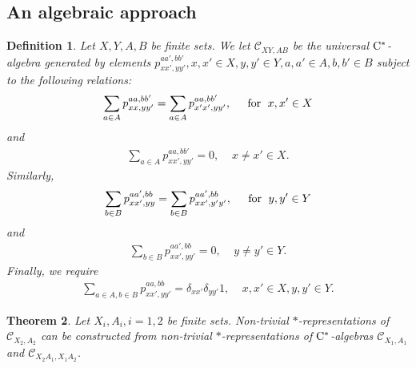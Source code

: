 \documentclass[11pt]{amsart}
\newtheorem{theorem}{Theorem}[section]
\newtheorem{definition}[theorem]{Definition}
\newcommand{\cl}[1]{\mathcal{#1}}
\begin{document}
\subsection{An algebraic approach}
\begin{definition}
Let $X, Y, A, B$ be finite sets. We let $\cl{C}_{XY, AB}$ be the universal ${\rm C}^{*}$-algebra generated by elements $p_{xx', yy'}^{aa', bb'}, x, x' \in X, y, y' \in Y, a, a' \in A, b, b' \in B$ subject to the following relations:
\begin{gather}\label{universal_relations_one}
	\sum_{a \in A}p_{xx, yy'}^{aa, bb'} = \sum_{a \in A}p_{x'x', yy'}^{aa, bb'}, \;\;\;\; \text{ for \;} x, x' \in X
\end{gather}
\noindent and
\begin{gather}\label{universal_relations_two}
	\sum_{a \in A}p_{xx', yy'}^{aa, bb'} = 0, \;\;\;\; x \neq x' \in X.
\end{gather}
\noindent Similarly, 
\begin{gather}\label{universal_relations_three}
	\sum_{b \in B}p_{xx', yy}^{aa', bb} = \sum_{b \in B}p_{xx', y'y'}^{aa', bb}, \;\;\;\; \text{ for \;} y, y' \in Y
\end{gather}
\noindent and
\begin{gather}\label{universal_relations_four}
	\sum_{b \in B}p_{xx', yy'}^{aa', bb} = 0, \;\;\;\; y \neq y' \in Y.
\end{gather}
\noindent Finally, we require
\begin{gather}\label{universal_relations_five}
	\sum\limits_{a \in A, b \in B}p_{xx', yy'}^{aa, bb} = \delta_{xx'}\delta_{yy'}1, \;\;\;\; x, x' \in X, y, y' \in Y.
\end{gather}
\end{definition}
\begin{theorem}\label{rep_of_c_alg}
Let $X_{i}, A_{i}, i = 1, 2$ be finite sets. Non-trivial $*$-representations of $\cl{C}_{X_{2}, A_{2}}$ can be constructed from non-trivial $*$-representations of ${\rm C}^{*}$-algebras $\cl{C}_{X_{1}, A_{1}}$ and $\cl{C}_{X_{2}A_{1}, X_{1}A_{2}}$.
\end{theorem}
\end{document}
